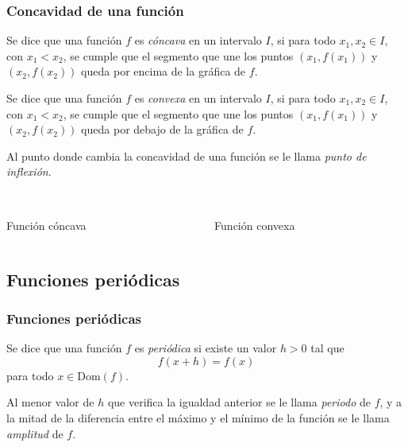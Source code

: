 	\begin{frame}
		\frametitle{Concavidad de una función}
		\begin{definicion}
			Se dice que una función $f$ es \emph{cóncava} en un intervalo $I$, si para todo $x_1,x_2\in I$, con $x_1<x_2$, se cumple
			que el segmento que une los puntos $(x_1,f(x_1))$ y $(x_2,f(x_2))$ queda por encima de la gráfica de $f$.
			
			Se dice que una función $f$ es \emph{convexa} en un intervalo $I$, si para todo $x_1,x_2\in I$, con $x_1<x_2$, se cumple
			que el segmento que une los puntos $(x_1,f(x_1))$ y $(x_2,f(x_2))$ queda por debajo de la gráfica de $f$.
			
			Al punto donde cambia la concavidad de una función se le llama \emph{punto de inflexión}.
		\end{definicion}
		
		\begin{columns}
			\begin{column}{0.4\textwidth}
				\begin{center}
					\scalebox{1}{}\\
					\color{red}Función cóncava
				\end{center}
			\end{column}
			\begin{column}{0.4\textwidth}
				\begin{center}
					\scalebox{1}{}\\
					\color{red}Función convexa
				\end{center}
			\end{column}
		\end{columns}
	\end{frame} 
	
	
	
	\subsection{Funciones periódicas}
	\begin{frame}
		\frametitle{Funciones periódicas}
		\begin{definicion}
			Se dice que una función $f$ es \emph{periódica} si existe un valor $h>0$ tal que
			\[f(x+h)=f(x)\]
			para todo $x\in \textrm{Dom}(f)$.
			
			Al menor valor de $h$ que verifica la igualdad anterior se le llama \emph{periodo} de $f$, y a la mitad de la diferencia entre el
			máximo y el mínimo de la función se le llama \emph{amplitud} de $f$.
		\end{definicion}
		
		\begin{center}
			\scalebox{0.8}{}
		\end{center}
	\end{frame} 
	
